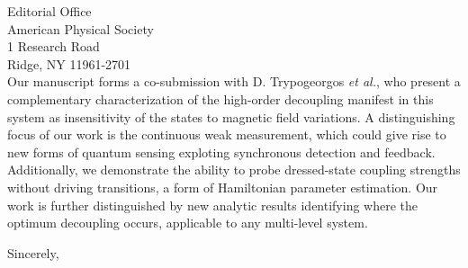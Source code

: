 \documentclass[10pt,letterpaper]{letter} %
\begin{document}
\begin{letter}{
    Editorial Office\\
    American Physical Society\\
    1 Research Road \\
    Ridge, NY 11961-2701\\
}
Our manuscript forms a co-submission with D. Trypogeorgos \textit{et al.}, who present a complementary characterization of the high-order decoupling manifest in this system as insensitivity of the states to magnetic field variations.
A distinguishing focus of our work is the continuous weak measurement, which could give rise to new forms of quantum sensing exploting synchronous detection and feedback.
Additionally, we demonstrate the ability to probe dressed-state coupling strengths without driving transitions, a form of Hamiltonian parameter estimation.
Our work is further distinguished by new analytic results identifying where the optimum decoupling occurs, applicable to any multi-level system.

\closing{Sincerely,}

\def\thefootnote{}
\def\footnoterule{\hrule}
\footnotetext{\hspace*{\fill}{\footnotesize \centering %
School of Physics \& Astronomy, Faculty of Science, 19 Rainforest Walk, Monash University, Victoria 3800, Australia \\
$\blacksquare$ Telephone +61 3 9905 3645 $\blacksquare$ Facsimile +61 3 9905 3637 $\blacksquare$ physics.monash.edu \\
ABN 12 377 614 012 CRICOS provider number 00008C \\
}}
\def\thefootnote{footnote}

\end{letter}
\end{document}
